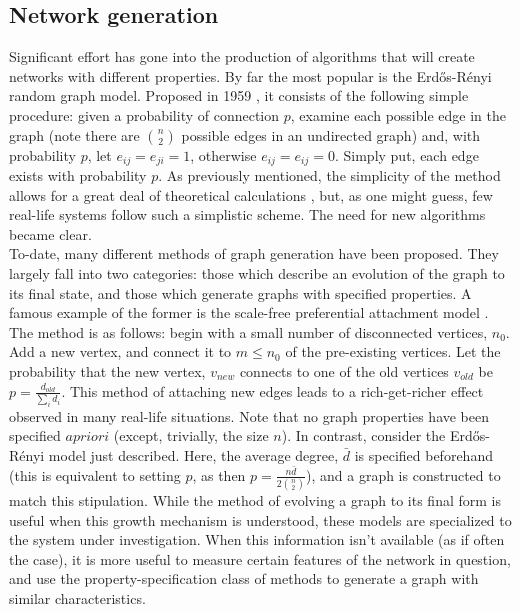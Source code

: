 \documentclass[11pt]{article}
\begin{document}
\subsection{Network generation}
Significant effort has gone into the production of algorithms that will create networks with different properties. By far the most popular is the Erd\H{o}s-R\'{e}nyi random graph model. Proposed in 1959 \cite{originalERpaper}, it consists of the following simple procedure: given a probability of connection $p$, examine each possible edge in the graph (note there are ${n \choose 2}$ possible edges in an undirected graph) and, with probability $p$, let $e_{ij}=e_{ji}=1$, otherwise $e_{ij}=e_{ij}=0$. Simply put, each edge exists with probability $p$. As previously mentioned, the simplicity of the method allows for a great deal of theoretical calculations \cite{a couple math papers}, but, as one might guess, few real-life systems follow such a simplistic scheme. The need for new algorithms became clear. \vspace{1mm}\\
To-date, many different methods of graph generation have been proposed. They largely fall into two categories: those which describe an evolution of the graph to its final state, and those which generate graphs with specified properties. A famous example of the former is the scale-free preferential attachment model \cite{emergenceOfScalingInRandNet}. The method is as follows: begin with a small number of disconnected vertices, $n_{0}$. Add a new vertex, and connect it to $m\le n_{0}$ of the pre-existing vertices. Let the probability that the new vertex, $v_{new}$ connects to one of the old vertices $v_{old}$ be $p=\frac{d_{old}}{\sum\limits_{i} d_{i}}$. This method of attaching new edges leads to a rich-get-richer effect observed in many real-life situations. Note that no graph properties have been specified $a priori$ (except, trivially, the size $n$). In contrast, consider the Erd\H{o}s-R\'{e}nyi model just described. Here, the average degree, $\bar{d}$ is specified beforehand (this is equivalent to setting $p$, as then $p=\frac{n\bar{d}}{2 {n \choose 2}}$), and a graph is constructed to match this stipulation. While the method of evolving a graph to its final form is useful when this growth mechanism is understood, these models are specialized to the system under investigation. When this information isn't available (as if often the case), it is more useful to measure certain features of the network in question, and use the property-specification class of methods to generate a graph with similar characteristics.\vspace{1mm}\\
\end{document}
